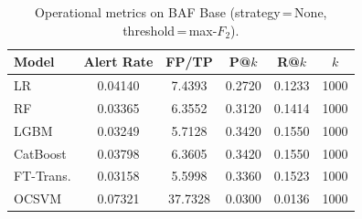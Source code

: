 \begin{table}[ht!]
\centering
\caption{Operational metrics on BAF Base (strategy\,=\,None, threshold\,=\,max-$F_2$).}
\label{tab:ops_baf}
\begin{tabular}{l c c c c c}
\toprule
Model & Alert Rate & FP/TP & P@$k$ & R@$k$ & $k$ \\
\midrule
LR         & 0.04140 & 7.4393 & 0.2720 & 0.1233 & 1000 \\
RF         & 0.03365 & 6.3552 & 0.3120 & 0.1414 & 1000 \\
LGBM       & 0.03249 & 5.7128 & 0.3420 & 0.1550 & 1000 \\
CatBoost   & 0.03798 & 6.3605 & 0.3420 & 0.1550 & 1000 \\
FT-Trans.  & 0.03158 & 5.5998 & 0.3360 & 0.1523 & 1000 \\
OCSVM      & 0.07321 & 37.7328 & 0.0300 & 0.0136 & 1000 \\
\bottomrule
\end{tabular}
\end{table}